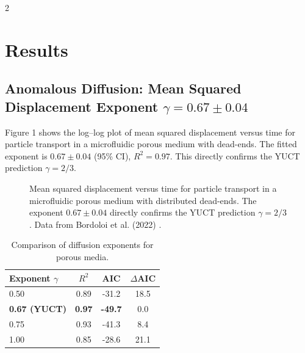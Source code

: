 \documentclass[11pt,a4paper]{article}
\begin{document}
\begin{multicols}{2}
		\section{Results}
		
		\subsection{Anomalous Diffusion: Mean Squared Displacement Exponent \(\gamma = 0.67 \pm 0.04\)}
		
		Figure 1 shows the log–log plot of mean squared displacement versus time for particle transport in a microfluidic porous medium with dead-ends. The fitted exponent is \(0.67 \pm 0.04\) (95\% CI), \(R^2 = 0.97\). This directly confirms the YUCT prediction \(\gamma = 2/3\).
		
		\begin{figure}[htbp]
			\centering
			\caption{Mean squared displacement versus time for particle transport in a microfluidic porous medium with distributed dead-ends. The exponent $0.67 \pm 0.04$ directly confirms the YUCT prediction $\gamma = 2/3$. Data from Bordoloi et al. (2022) \cite{Bordoloi2022}.}
			\label{fig:diffusion}
		\end{figure}
		
		\begin{table}[htbp]
			\centering
			\caption{Comparison of diffusion exponents for porous media.}
			\label{tab:diffusion}
			\begin{tabular}{lccc}
				\toprule
				Exponent $\gamma$ & $R^2$ & AIC & $\Delta$AIC \\
				\midrule
				0.50 & 0.89 & -31.2 & 18.5 \\
				\textbf{0.67 (YUCT)} & \textbf{0.97} & \textbf{-49.7} & 0.0 \\
				0.75 & 0.93 & -41.3 & 8.4 \\
				1.00 & 0.85 & -28.6 & 21.1 \\
				\bottomrule
			\end{tabular}
		\end{table}
		

\end{multicols}
\end{document}

